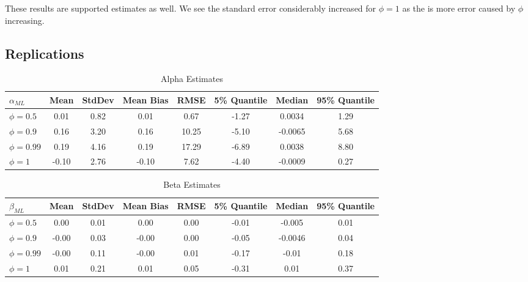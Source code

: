 \documentclass[12pt]{article}
\begin{document}
These results are supported estimates as well. We see the standard 
error considerably increased for $\phi = 1$ as the is more error caused
by $\phi$ increasing. 

\subsection*{Replications}

\begin{table}[h!]
    \centering
    \begin{tabular}{lccccccc}
        \toprule
        $\alpha_{ML}$ & Mean & StdDev & Mean Bias & RMSE & 5\% Quantile & Median & 95\% Quantile \\
        \midrule
        $\phi = 0.5$ & 0.01 & 0.82 & 0.01 & 0.67 & -1.27 & 0.0034 & 1.29 \\
        $\phi = 0.9$ & 0.16 & 3.20 & 0.16 & 10.25 & -5.10 & -0.0065 & 5.68 \\
        $\phi = 0.99$ & 0.19 & 4.16 & 0.19 & 17.29 & -6.89 & 0.0038 & 8.80 \\
        $\phi = 1$ & -0.10 & 2.76 & -0.10 & 7.62 & -4.40 & -0.0009 & 0.27 \\
        \bottomrule
    \end{tabular}
    \caption{Alpha Estimates}
    \label{tab:alpha_estimates}
\end{table}

\begin{table}[h!]
    \centering
    \begin{tabular}{lccccccc}
        \toprule
        $\beta_{ML}$ & Mean & StdDev & Mean Bias & RMSE & 5\% Quantile & Median & 95\% Quantile \\
        \midrule
        $\phi = 0.5$ & 0.00 & 0.01 & 0.00 & 0.00 & -0.01 & -0.005 & 0.01 \\
        $\phi = 0.9$ & -0.00 & 0.03 & -0.00 & 0.00 & -0.05 & -0.0046 & 0.04 \\
        $\phi = 0.99$ & -0.00 & 0.11 & -0.00 & 0.01 & -0.17 & -0.01 & 0.18 \\
        $\phi = 1$ & 0.01 & 0.21 & 0.01 & 0.05 & -0.31 & 0.01 & 0.37 \\
        \bottomrule
    \end{tabular}
    \caption{Beta Estimates}
    \label{tab:beta_estimates}
\end{table}
\end{document}
